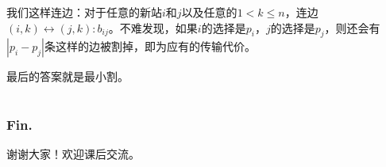 \documentclass[11pt,dvipsnames,table]{beamer}
\begin{document}
{\begin{frame}
	我们这样连边：对于任意的新站$i$和$j$以及任意的$1<k\leq n$，连边$(i,k)\leftrightarrow (j,k):b_{ij}$。不难发现，如果$i$的选择是$p_i$，$j$的选择是$p_j$，则还会有$|p_i-p_j|$条这样的边被割掉，即为应有的传输代价。
	
	最后的答案就是最小割。
\end{frame}

\appendix
\section{}
\begin{frame}
	\frametitle{Fin.}
	\centering
	\LARGE
	谢谢大家！欢迎课后交流。
\end{frame}
}
\end{document}
